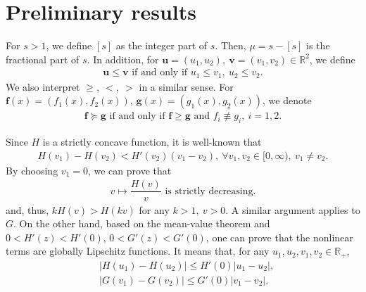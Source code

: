 \documentclass[a4paper,11pt]{amsart}
\theoremstyle{definition}
\def\R{\mathbb{R}}
\numberwithin{equation}{section}
\theoremstyle{definition}
\begin{document}
\section{\bf Preliminary results} \label{section:2}

For $s>1$, we define $[s]$ as the integer part of $s$. Then, $\mu=s-[s]$ is the fractional part of $s$. In addition, for $\textbf{u}=(u_1,u_2),~\textbf{v}=(v_1,v_2)\in \R^2$, we define
\begin{align*}
\textbf{u}\leq \textbf{v} \text{ if and only if } u_1\leq v_1,~u_2\leq v_2.
\end{align*}
We also interpret $\geq,~<,~>$ in a similar sense. For $\textbf{f}(x)=(f_1(x),f_2(x))$, $\textbf{g}(x)=(g_1(x),g_2(x))$, we denote
\begin{align*}
\textbf{f}\succeq\textbf{g} \text{ if and only if } \textbf{f}\geq \textbf{g} \text{ and } f_i\not\equiv g_i,~i=1,2.
\end{align*}


Since $H$ is a strictly concave function, it is well-known that 
\begin{align*}
H(v_1)-H(v_2)< H'(v_2)(v_1-v_2),~\forall v_1, v_2\in [0,\infty),~ v_1\neq v_2.
\end{align*}
By choosing $v_1 =0$, we can prove that
\begin{align*}
v\mapsto \dfrac{H(v)}{v} \text{ is strictly decreasing.}
\end{align*}
and, thus, $kH(v)> H(kv)$ for any $k>1,~v>0$. A similar argument applies to $G$. On the other hand, based on the mean-value theorem and $0<H'(z)<H'(0)$, $0<G'(z)<G'(0)$, one can prove that the nonlinear terms are globally Lipschitz functions. It means that, for any $u_1,u_2,v_1,v_2\in \R_+$,
\begin{align*}
&|H(u_1)-H(u_2)|\leq H'(0)|u_1-u_2|,\\
&|G(v_1)-G(v_2)|\leq G'(0)|v_1-v_2|.
\end{align*}
\end{document}
